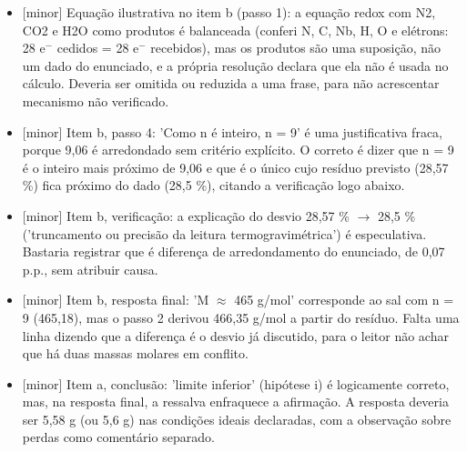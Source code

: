 \documentclass{article}%
\begin{document}
\begin{itemize}%
\item%
{[}minor{]} Equação ilustrativa no item b (passo 1): a equação redox com N2, CO2 e H2O como produtos é balanceada (conferi N, C, Nb, H, O e elétrons: 28 e$^{-}$ cedidos = 28 e$^{-}$ recebidos), mas os produtos são uma suposição, não um dado do enunciado, e a própria resolução declara que ela não é usada no cálculo. Deveria ser omitida ou reduzida a uma frase, para não acrescentar mecanismo não verificado.%
\item%
{[}minor{]} Item b, passo 4: 'Como n é inteiro, n = 9' é uma justificativa fraca, porque 9,06 é arredondado sem critério explícito. O correto é dizer que n = 9 é o inteiro mais próximo de 9,06 e que é o único cujo resíduo previsto (28,57 \%) fica próximo do dado (28,5 \%), citando a verificação logo abaixo.%
\item%
{[}minor{]} Item b, verificação: a explicação do desvio 28,57 \% $\to$ 28,5 \% ('truncamento ou precisão da leitura termogravimétrica') é especulativa. Bastaria registrar que é diferença de arredondamento do enunciado, de 0,07 p.p., sem atribuir causa.%
\item%
{[}minor{]} Item b, resposta final: 'M $\approx$ 465 g/mol' corresponde ao sal com n = 9 (465,18), mas o passo 2 derivou 466,35 g/mol a partir do resíduo. Falta uma linha dizendo que a diferença é o desvio já discutido, para o leitor não achar que há duas massas molares em conflito.%
\item%
{[}minor{]} Item a, conclusão: 'limite inferior' (hipótese i) é logicamente correto, mas, na resposta final, a ressalva enfraquece a afirmação. A resposta deveria ser 5,58 g (ou 5,6 g) nas condições ideais declaradas, com a observação sobre perdas como comentário separado.%
\end{itemize}%
\end{document}
